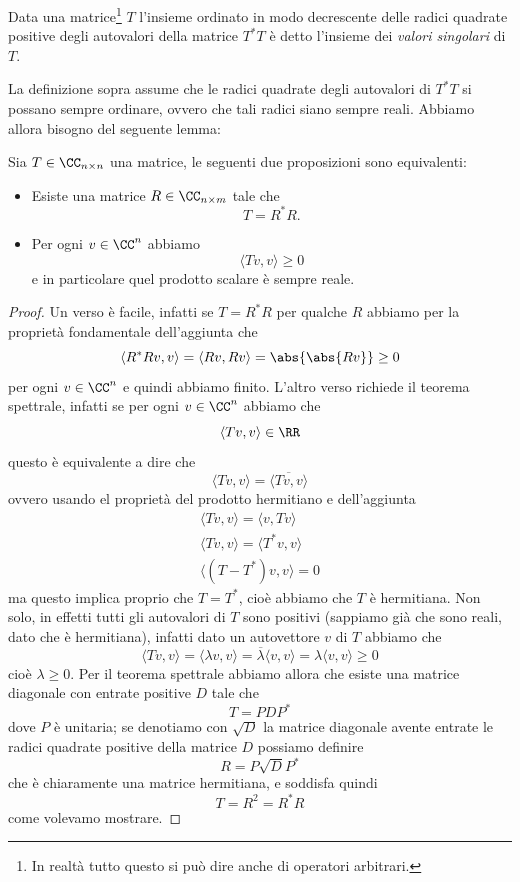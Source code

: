 \documentclass[11pt]{scrartcl}
\begin{document}
   	 \begin{definition}
   	 	Data una matrice\footnote{In realtà tutto questo si può dire anche di operatori arbitrari.} $T$ l'insieme ordinato in modo decrescente delle radici quadrate positive degli autovalori della matrice $T^*T$ è detto l'insieme dei \textit{valori singolari} di $T$.
   	 \end{definition}
   	 La definizione sopra assume che le radici quadrate degli autovalori di $T^*T$ si possano sempre ordinare, ovvero che tali radici siano sempre reali. Abbiamo allora bisogno del seguente lemma:
   	 \begin{proposition}
   	 	Sia $T\in\CC_{n\times n}$ una matrice, le seguenti due proposizioni sono equivalenti:
   	 	\begin{itemize}
   	 		\item Esiste una matrice $R\in\CC_{n\times m}$ tale che
   	 			$$T=R^*R.$$
   	 		\item Per ogni $v\in \CC^n$ abbiamo
   	 		$$\langle Tv,v\rangle\ge 0$$
   	 		e in particolare quel prodotto scalare è sempre reale.
   	 	\end{itemize}
   	 \end{proposition}
   	 \begin{proof}
   	 	Un verso è facile, infatti se $T=R^*R$ per qualche $R$ abbiamo per la proprietà fondamentale dell'aggiunta che 
   	 	$$\langle R^*Rv,v\rangle=\langle Rv,Rv\rangle =\abs{\abs{Rv}}\ge 0$$
   	 	per ogni $v\in \CC^n$ e quindi abbiamo finito. L'altro verso richiede il teorema spettrale, infatti se per ogni $v\in \CC^n$ abbiamo che
   	 	$$\langle Tv,v\rangle \in \RR$$
   	 	questo è equivalente a dire che 
   	 	$$\langle Tv,v\rangle=\overline{\langle Tv,v\rangle}$$
   	 	ovvero usando el proprietà del prodotto hermitiano e dell'aggiunta
   	 	\begin{gather*}
   	 		\langle Tv,v\rangle = \langle v,Tv\rangle \\
   	 		\langle Tv,v\rangle = \langle T^*v,v\rangle \\
   	 		\langle\left(T-T^*\right)v,v\rangle=0
   	 	\end{gather*}
   	 	ma questo implica proprio che $T=T^*$, cioè abbiamo che $T$ è hermitiana. Non solo, in effetti tutti gli autovalori di $T$ sono positivi (sappiamo già che sono reali, dato che è hermitiana), infatti dato un autovettore $v$ di $T$ abbiamo che
   	 	$$\langle Tv,v\rangle = \langle \lambda v,v\rangle=\overline{\lambda} \langle v,v\rangle=\lambda \langle v,v\rangle\ge 0$$
   	 	cioè $\lambda\ge 0$. Per il teorema spettrale abbiamo allora che esiste una matrice diagonale con entrate positive $D$ tale che
   	 	$$T=PDP^*$$
   	 	dove $P$ è unitaria; se denotiamo con $\sqrt{D}$ la matrice diagonale avente entrate le radici quadrate positive della matrice $D$ possiamo definire
   	 	$$R=P\sqrt{D}P^*$$
   	 	che è chiaramente una matrice hermitiana, e soddisfa quindi
   	 	$$T=R^2=R^*R$$
   	 	come volevamo mostrare.
   	 \end{proof}
\end{document}
